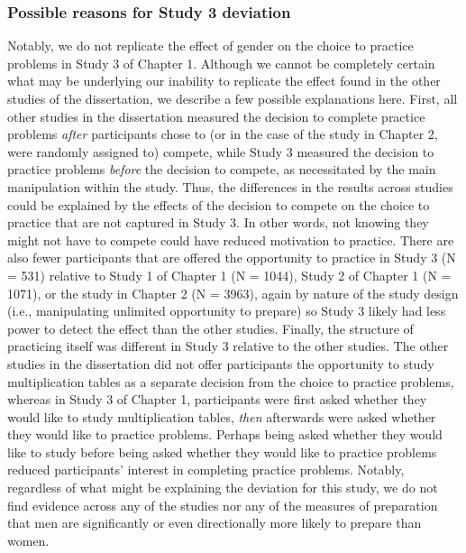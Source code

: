 \documentclass[letterpaper, nobind]{templates/ociamthesis}
\begin{document}
\hypertarget{possible-reasons-for-study-3-deviation}{%
\subsubsection{Possible reasons for Study 3 deviation}\label{possible-reasons-for-study-3-deviation}}

Notably, we do not replicate the effect of gender on the choice to practice problems in Study 3 of Chapter 1. Although we cannot be completely certain what may be underlying our inability to replicate the effect found in the other studies of the dissertation, we describe a few possible explanations here. First, all other studies in the dissertation measured the decision to complete practice problems \emph{after} participants chose to (or in the case of the study in Chapter 2, were randomly assigned to) compete, while Study 3 measured the decision to practice problems \emph{before} the decision to compete, as necessitated by the main manipulation within the study. Thus, the differences in the results across studies could be explained by the effects of the decision to compete on the choice to practice that are not captured in Study 3. In other words, not knowing they might not have to compete could have reduced motivation to practice. There are also fewer participants that are offered the opportunity to practice in Study 3 (N = 531) relative to Study 1 of Chapter 1 (N = 1044), Study 2 of Chapter 1 (N = 1071), or the study in Chapter 2 (N = 3963), again by nature of the study design (i.e., manipulating unlimited opportunity to prepare) so Study 3 likely had less power to detect the effect than the other studies. Finally, the structure of practicing itself was different in Study 3 relative to the other studies. The other studies in the dissertation did not offer participants the opportunity to study multiplication tables as a separate decision from the choice to practice problems, whereas in Study 3 of Chapter 1, participants were first asked whether they would like to study multiplication tables, \emph{then} afterwards were asked whether they would like to practice problems. Perhaps being asked whether they would like to study before being asked whether they would like to practice problems reduced participants' interest in completing practice problems. Notably, regardless of what might be explaining the deviation for this study, we do not find evidence across any of the studies nor any of the measures of preparation that men are significantly or even directionally more likely to prepare than women.
\end{document}
